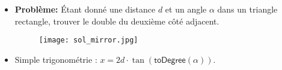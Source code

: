 \begin{frame}
    \frametitle{\problemtitle}
    \begin{itemize}
        \item<+-> \textbf{Problème:} Étant donné une distance $d$ et un angle $\alpha$ dans un triangle rectangle, trouver le double du deuxième côté adjacent.
        \begin{figure}
            \centering
            \texttt{[image: sol\_mirror.jpg]}
       \end{figure}
        \item<+-> Simple trigonométrie : $x=2d\cdot\tan(\mathsf{toDegree}(\alpha))$.
    \end{itemize}
\end{frame}
